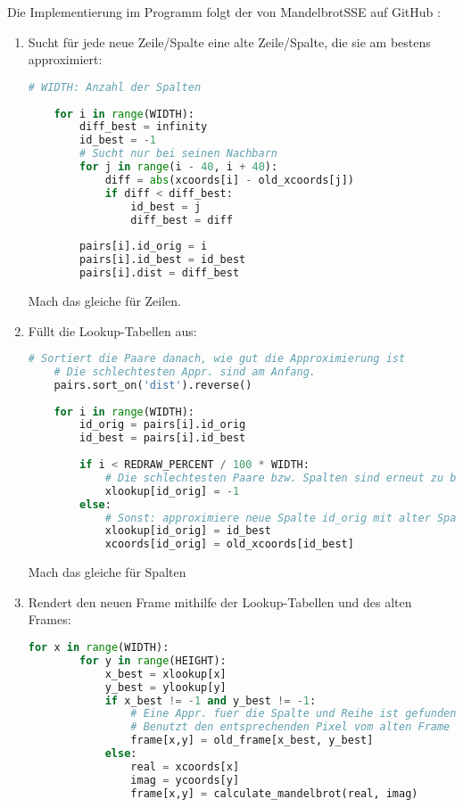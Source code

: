 \documentclass{article}
\begin{document}
Die Implementierung im Programm folgt der von MandelbrotSSE auf GitHub \cite{sse}:
\begin{enumerate}
\item Sucht für jede neue Zeile/Spalte eine alte Zeile/Spalte, die sie am bestens approximiert:
	\begin{lstlisting}[language=python]
	# WIDTH: Anzahl der Spalten
	
	for i in range(WIDTH):
		diff_best = infinity 
		id_best = -1 
		# Sucht nur bei seinen Nachbarn
		for j in range(i - 40, i + 40):
			diff = abs(xcoords[i] - old_xcoords[j])
			if diff < diff_best:
				id_best = j
				diff_best = diff
					
		pairs[i].id_orig = i
		pairs[i].id_best = id_best
		pairs[i].dist = diff_best
	\end{lstlisting}
	
	Mach das gleiche für Zeilen.
	
\item Füllt die Lookup-Tabellen aus:
	\begin{lstlisting}[language=python]
	# Sortiert die Paare danach, wie gut die Approximierung ist
	# Die schlechtesten Appr. sind am Anfang.
	pairs.sort_on('dist').reverse()
	
	for i in range(WIDTH):
		id_orig = pairs[i].id_orig
		id_best = pairs[i].id_best
		
		if i < REDRAW_PERCENT / 100 * WIDTH:
			# Die schlechtesten Paare bzw. Spalten sind erneut zu berechnen
			xlookup[id_orig] = -1
		else: 
			# Sonst: approximiere neue Spalte id_orig mit alter Spalte id_best
			xlookup[id_orig] = id_best
			xcoords[id_orig] = old_xcoords[id_best]
	\end{lstlisting}
	
	Mach das gleiche für Spalten
	
\item Rendert den neuen Frame mithilfe der Lookup-Tabellen und des alten Frames:
	\begin{lstlisting}[language=python]
	for x in range(WIDTH):
		for y in range(HEIGHT):
			x_best = xlookup[x]
			y_best = ylookup[y]
			if x_best != -1 and y_best != -1:
				# Eine Appr. fuer die Spalte und Reihe ist gefunden
				# Benutzt den entsprechenden Pixel vom alten Frame
				frame[x,y] = old_frame[x_best, y_best]
			else:
				real = xcoords[x]
				imag = ycoords[y]
				frame[x,y] = calculate_mandelbrot(real, imag)
	\end{lstlisting}
\end{enumerate}
\end{document}
